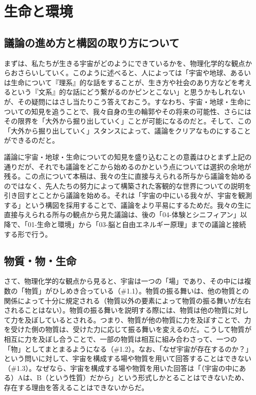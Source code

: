 \section{生命と環境}\label{ux7b2cux4e00ux7ae0ux751fux547dux3068ux74b0ux5883}

\subsection{議論の進め方と構図の取り方について}\label{ux8b70ux8ad6ux306eux9032ux3081ux65b9ux3068ux69cbux56f3ux306eux53d6ux308aux65b9ux306bux3064ux3044ux3066}

まずは、私たちが生きる宇宙がどのようにできているかを、物理化学的な観点からおさらいしていく。このように述べると、人によっては「宇宙や地球、あるいは生命について『理系』的な話をすることが、生き方や社会のあり方などを考えるという『文系』的な話にどう繋がるのかピンとこない」と思うかもしれないが、その疑問にはさし当たりこう答えておこう。すなわち、宇宙・地球・生命についての知見を追うことで、我々自身の生の輪郭やその将来の可能性、さらにはその限界を「大外から掘り出していく」ことが可能になるのだと。そして、この「大外から掘り出していく」スタンスによって、議論をクリアなものにすることができるのだと。

議論に宇宙・地球・生命についての知見を盛り込むことの意義はひとまず上記の通りだが、それでも議論をどこから始めるのかという点については選択の余地が残る。この点について本稿は、我々の生に直接与えられる所与から議論を始めるのではなく、先人たちの努力によって構築された客観的な世界についての説明を引き回すとことから議論を始める。それは「宇宙の中にいる我々が、宇宙を観測する」という構図を採用することで、議論をより平易にするためだ。我々の生に直接与えられる所与の観点から見た議論は、後の「04-体験とシニフィアン」以降で、「01-生命と環境」から「03-脳と自由エネルギー原理」までの議論と接続する形で行う。

\subsection{物質・物・生命}\label{ux7269ux8ceaux7269ux751fux547d}

さて、物理化学的な観点から見ると、宇宙は一つの「場」であり、その中には複数の「物質」がひしめき合っている（\#1.1）。物質の振る舞いは、他の物質との関係によって十分に規定される（物質以外の要素によって物質の振る舞いが左右されることはない）。物質の振る舞いを説明する際には、物質は他の物質に対して力を及ぼしているとされる。つまり、物質が他の物質に力を及ぼすことで、力を受けた側の物質は、受けた力に応じて振る舞いを変えるのだ。こうして物質が相互に力を及ぼし合うことで、一部の物質は相互に組み合わさって、一つの「物」としてまとまるようになる（\#1.2）。なお、「なぜ宇宙が存在するのか？」という問いに対して、宇宙を構成する場や物質を用いて回答することはできない（\#1.3）。なぜなら、宇宙を構成する場や物質を用いた回答は「（宇宙の中にある）Aは、B（という性質）だから」という形式しかとることはできないため、存在する理由を答えることはできないからだ。

